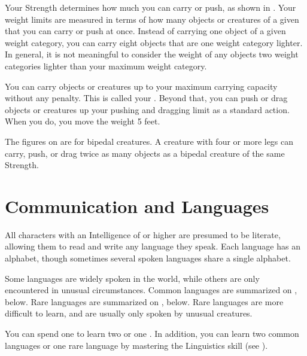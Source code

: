     Your Strength determines how much you can carry or push, as shown in .
    Your weight limits are measured in terms of how many objects or creatures of a given  that you can carry or push at once.
    Instead of carrying one object of a given weight category, you can carry eight objects that are one weight category lighter.
    In general, it is not meaningful to consider the weight of any objects two weight categories lighter than your maximum weight category.

    You can carry objects or creatures up to your maximum carrying capacity without any penalty.
    This is called your .
    Beyond that, you can push or drag objects or creatures up your pushing and dragging limit as a standard action.
    When you do, you move the weight 5 feet.

     The figures on  are for bipedal creatures.
    A creature with four or more legs can carry, push, or drag twice as many objects as a bipedal creature of the same Strength.

\section{Communication and Languages}\label{Languages}\label{Communication and Languages}

    All characters with an Intelligence of  or higher are presumed to be literate, allowing them to read and write any language they speak. Each language has an alphabet, though sometimes several spoken languages share a single alphabet.

    \label{Language Rarity}
    Some languages are widely spoken in the world, while others are only encountered in unusual circumstances.
    Common languages are summarized on , below.
    Rare languages are summarized on , below.
    Rare languages are more difficult to learn, and are usually only spoken by unusual creatures.

    \label{Learning Languages}
    You can spend one  to learn two  or one .
    In addition, you can learn two common languages or one rare language by mastering the Linguistics skill (see ).

